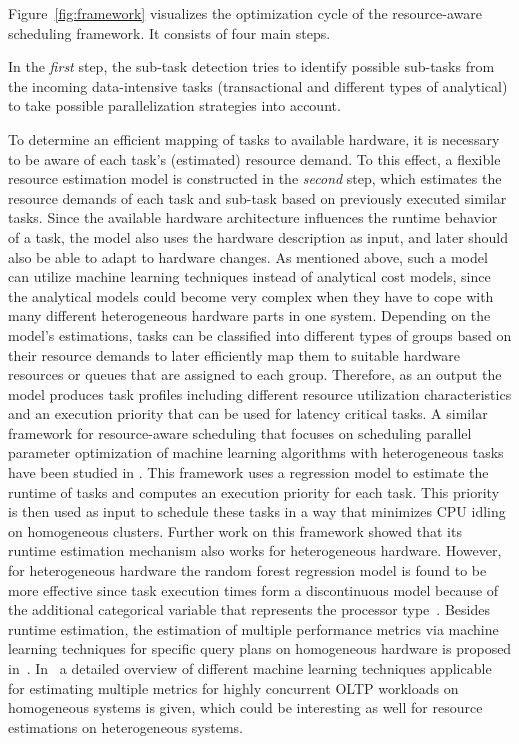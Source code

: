 \documentclass[11pt,dvipdfm]{article}
\newcommand{\reffig}[1]{Figure~\ref{fig:#1}}
\begin{document}
\reffig{framework} visualizes the optimization cycle of the resource-aware scheduling framework.
It consists of four main steps.

In the \textit{first} step,
the sub-task detection tries to identify possible sub-tasks from the incoming data-intensive tasks
(transactional and different types of analytical) to take possible parallelization strategies into account.

To determine an efficient mapping of tasks to available hardware,
it is necessary to be aware of each task’s (estimated) resource demand.
To this effect, a flexible resource estimation model is constructed in the \textit{second} step,
which estimates the resource demands of each task and sub-task based on previously executed similar tasks.
Since the available hardware architecture influences the runtime behavior of a task,
the model also uses the hardware description as input,
and later should also be able to adapt to hardware changes.
As mentioned above,
such a model can utilize machine learning techniques instead of analytical cost models,
since the analytical models could become very complex
when they have to cope with many different heterogeneous hardware parts in one system.
Depending on the model's estimations,
tasks can be classified into different types of groups based on their resource demands
to later efficiently map them to suitable hardware resources or queues that are assigned to each group.
Therefore, as an output the model produces task profiles
including different resource utilization characteristics and
an execution priority that can be used for latency critical tasks. 
A similar framework for resource-aware scheduling that focuses on scheduling
parallel parameter optimization of machine learning algorithms with heterogeneous tasks
have been studied in \cite{kotthaus_2017a}.
This framework uses a regression model to estimate the runtime of tasks
and computes an execution priority for each task.
This priority is then used as input to schedule these tasks
in a way that minimizes CPU idling on homogeneous clusters.
Further work on this framework showed that its runtime estimation mechanism also works for heterogeneous hardware.
However, for heterogeneous hardware the random forest regression model is found to be more effective since
task execution times form a discontinuous model
because of the additional categorical variable that represents the processor type~\cite{kotthaus_2018}. 
Besides runtime estimation,
the estimation of multiple performance metrics via machine learning techniques
for specific query plans on homogeneous hardware is proposed in~\cite{Ganapathi_2009}.
In~\cite{Mozafari_2013} a detailed overview of different machine learning techniques applicable for estimating multiple metrics for highly concurrent OLTP workloads on homogeneous systems is given, which could be interesting as well for resource estimations on heterogeneous systems. 
\end{document}

